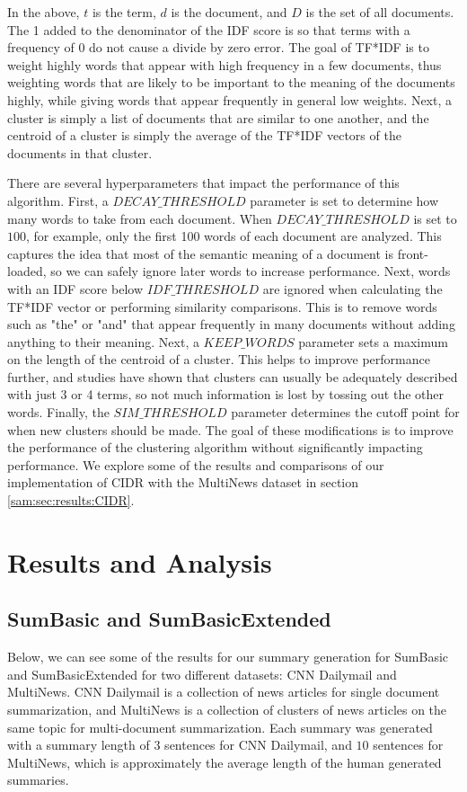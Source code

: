 \documentclass[../writeup.tex]{subfiles}
\begin{document}
In the above, $t$ is the term, $d$ is the document, and $D$ is the set of all documents.
The 1 added to the denominator of the IDF score is so that terms with a frequency of 0 do not cause a divide by zero error.
The goal of TF*IDF is to weight highly words that appear with high frequency in a few documents, thus weighting words that are likely to be important to the meaning of the documents highly, while giving words that appear frequently in general low weights.
Next, a cluster is simply a list of documents that are similar to one another, and the centroid of a cluster is simply the average of the TF*IDF vectors of the documents in that cluster.

There are several hyperparameters that impact the performance of this algorithm. First, a $DECAY\_THRESHOLD$ parameter is set to determine how many words to take from each document.
When $DECAY\_THRESHOLD$ is set to $100$, for example, only the first 100 words of each document are analyzed. This captures the idea that most of the semantic meaning of a document is front-loaded, so we can safely ignore later words to increase performance.
Next, words with an IDF score below $IDF\_THRESHOLD$ are ignored when calculating the TF*IDF vector or performing similarity comparisons.
This is to remove words such as "the" or "and" that appear frequently in many documents without adding anything to their meaning.
Next, a $KEEP\_WORDS$ parameter sets a maximum on the length of the centroid of a cluster.
This helps to improve performance further, and studies have shown that clusters can usually be adequately described with just 3 or 4 terms, so not much information is lost by tossing out the other words.
Finally, the $SIM\_THRESHOLD$ parameter determines the cutoff point for when new clusters should be made.
The goal of these modifications is to improve the performance of the clustering algorithm without significantly impacting performance.
We explore some of the results and comparisons of our implementation of CIDR with the MultiNews dataset in section \ref{sam:sec:results:CIDR}.


\section{Results and Analysis}\label{sam:sec:results}
\subsection{SumBasic and SumBasicExtended}\label{sam:sec:results:sum_basic_vs_extended}
Below, we can see some of the results for our summary generation for SumBasic and SumBasicExtended for two different datasets: CNN Dailymail and MultiNews.
CNN Dailymail is a collection of news articles for single document summarization, and MultiNews is a collection of clusters of news articles on the same topic for multi-document summarization.
Each summary was generated with a summary length of $3$ sentences for CNN Dailymail, and $10$ sentences for MultiNews, which is approximately the average length of the human generated summaries. 
\end{document}
